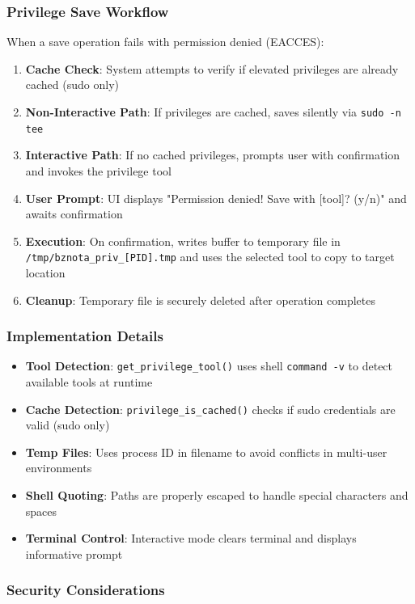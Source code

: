\documentclass[12pt,a4paper,oneside,openany]{report}
\begin{document}
\subsubsection{Privilege Save Workflow}

When a save operation fails with permission denied (EACCES):

\begin{enumerate}
	\item \textbf{Cache Check}: System attempts to verify if elevated privileges are already cached (sudo only)
	\item \textbf{Non-Interactive Path}: If privileges are cached, saves silently via \texttt{sudo -n tee}
	\item \textbf{Interactive Path}: If no cached privileges, prompts user with confirmation and invokes the privilege tool
	\item \textbf{User Prompt}: UI displays "Permission denied! Save with [tool]? (y/n)" and awaits confirmation
	\item \textbf{Execution}: On confirmation, writes buffer to temporary file in \texttt{/tmp/bznota\_priv\_[PID].tmp} and uses the selected tool to copy to target location
	\item \textbf{Cleanup}: Temporary file is securely deleted after operation completes
\end{enumerate}

\subsubsection{Implementation Details}

\begin{itemize}
	\item \textbf{Tool Detection}: \texttt{get\_privilege\_tool()} uses shell \texttt{command -v} to detect available tools at runtime
	\item \textbf{Cache Detection}: \texttt{privilege\_is\_cached()} checks if sudo credentials are valid (sudo only)
	\item \textbf{Temp Files}: Uses process ID in filename to avoid conflicts in multi-user environments
	\item \textbf{Shell Quoting}: Paths are properly escaped to handle special characters and spaces
	\item \textbf{Terminal Control}: Interactive mode clears terminal and displays informative prompt
\end{itemize}

\subsubsection{Security Considerations}
\end{document}
